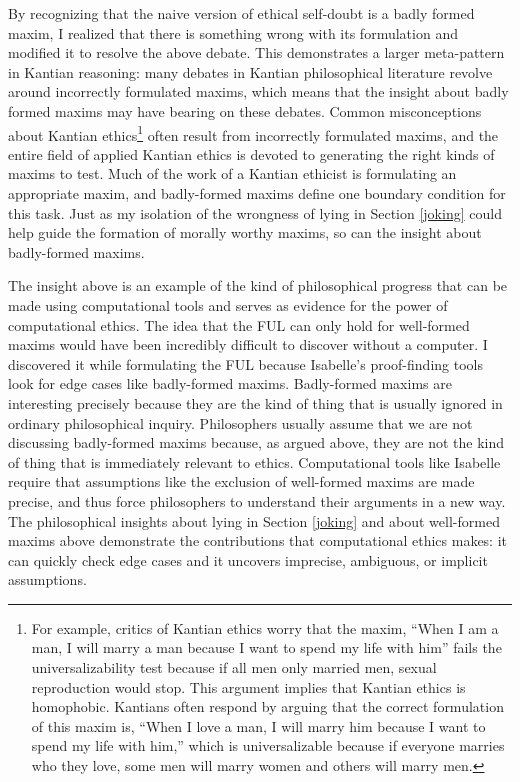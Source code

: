\begin{isabellebody}
\begin{isamarkuptext}
By recognizing that the naive version of ethical self-doubt is a badly formed maxim, I realized 
that there is something wrong with its formulation and modified it to resolve the above debate. 
This demonstrates a larger meta-pattern in Kantian reasoning: many debates in Kantian philosophical
literature revolve around incorrectly formulated maxims, which means that the insight about badly
formed maxims may have bearing on these debates. Common misconceptions about Kantian ethics\footnote{For example, critics
of Kantian ethics worry that the maxim, ``When I am a
man, I will marry a man because I want to spend my life with him'' fails the universalizability
test because if all men only married men, sexual reproduction would stop. This argument implies 
that Kantian ethics is homophobic. Kantians often respond by arguing that the correct formulation of 
this maxim is, ``When I love a man, I will marry him because I want to spend my life with him,'' which
is universalizable because if everyone marries who they love, some men will marry women and others will
marry men.} often result from incorrectly formulated maxims, 
and the entire field of applied Kantian ethics is devoted to generating the right kinds of maxims to test. 
Much of the work of a Kantian ethicist is formulating an
appropriate maxim, and badly-formed maxims define one boundary condition for this task. Just as my isolation
of the wrongness of lying in Section \ref{joking} could help guide the formation of morally worthy maxims, 
so can the insight about badly-formed maxims.%
\end{isamarkuptext}\isamarkuptrue%
%
\isadelimdocument
%
\endisadelimdocument
%
\isatagdocument
%
\isamarkuptrue%
%
\endisatagdocument
{\isafolddocument}%
%
\isadelimdocument
%
\endisadelimdocument
%
\begin{isamarkuptext}%
The insight above is an example of the kind of philosophical progress that can be 
made using computational tools and serves as evidence for the power of computational ethics. The 
idea that the FUL can only hold for well-formed maxims would have been
incredibly difficult to discover without a computer. I discovered it while formulating the FUL because 
Isabelle's proof-finding tools look for edge cases like badly-formed maxims. Badly-formed maxims are 
interesting precisely because they are the kind of thing that is usually ignored in ordinary philosophical inquiry. 
Philosophers usually assume that we are not discussing badly-formed maxims because, as argued above, 
they are not the kind of thing that is immediately relevant to ethics. Computational tools like Isabelle
require that assumptions like the exclusion of well-formed maxims are made precise, and thus force 
philosophers to understand their arguments in a new way. The philosophical insights about lying in Section
\ref{joking} and about well-formed maxims above demonstrate the contributions
that computational ethics makes: it can quickly check edge cases and it uncovers imprecise, ambiguous,
or implicit assumptions.


\end{isamarkuptext}
\end{isabellebody}
